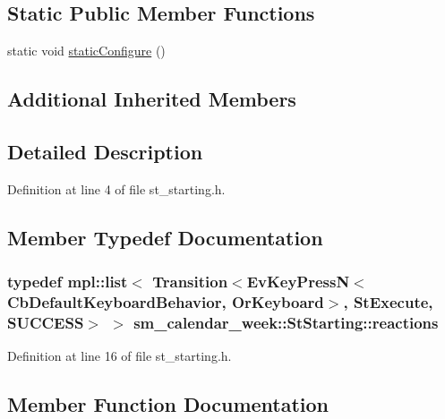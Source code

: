 \subsection*{Static Public Member Functions}
\begin{DoxyCompactItemize}
\item 
static void \hyperlink{structsm__calendar__week_1_1StStarting_a62ca80cbd623283f3ac6c2f226858f0f}{static\+Configure} ()
\end{DoxyCompactItemize}
\subsection*{Additional Inherited Members}


\subsection{Detailed Description}


Definition at line 4 of file st\+\_\+starting.\+h.



\subsection{Member Typedef Documentation}
\subsubsection[{\texorpdfstring{reactions}{reactions}}]{\setlength{\rightskip}{0pt plus 5cm}typedef mpl\+::list$<$ Transition$<$Ev\+Key\+PressN$<$Cb\+Default\+Keyboard\+Behavior, {\bf Or\+Keyboard}$>$, {\bf St\+Execute}, {\bf S\+U\+C\+C\+E\+SS}$>$ $>$ {\bf sm\+\_\+calendar\+\_\+week\+::\+St\+Starting\+::reactions}}\hypertarget{structsm__calendar__week_1_1StStarting_a4f40c2e8b54ea2ca7ba60fa616dfa753}{}\label{structsm__calendar__week_1_1StStarting_a4f40c2e8b54ea2ca7ba60fa616dfa753}


Definition at line 16 of file st\+\_\+starting.\+h.



\subsection{Member Function Documentation}
